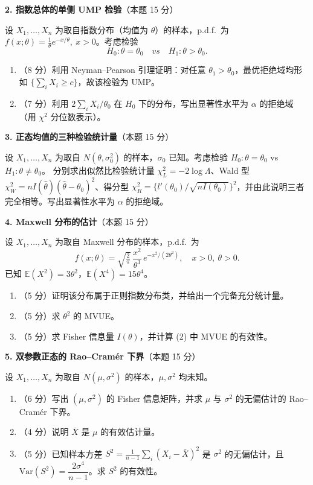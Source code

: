 \documentclass[12pt,a4paper]{ctexart}
\newcommand{\question}[2]{\bigskip\noindent\textbf{#1}\quad（本题 #2 分）\par\nobreak\medskip}
\newcommand{\E}{\mathbb{E}}
\newcommand{\Var}{\mathrm{Var}}
\begin{document}
\question{2. 指数总体的单侧 UMP 检验}{15}
设 $X_1,\dots,X_n$ 为取自指数分布（均值为 $\theta$）的样本，p.d.f.\ 为 $f(x;\theta)=\frac1\theta e^{-x/\theta},\ x>0$。考虑检验
\[ H_0:\theta=\theta_0 \quad vs \quad H_1:\theta>\theta_0. \]
\begin{enumerate}[label=(\arabic*),leftmargin=2.2em]
  \item （8 分）利用 Neyman--Pearson 引理证明：对任意 $\theta_1>\theta_0$，最优拒绝域均形如 $\{\sum_i X_i\ge c\}$，故该检验为 UMP。
  \item （7 分）利用 $2\sum_i X_i/\theta_0$ 在 $H_0$ 下的分布，写出显著性水平为 $\alpha$ 的拒绝域（用 $\chi^2$ 分位数表示）。
\end{enumerate}

\question{3. 正态均值的三种检验统计量}{15}
设 $X_1,\dots,X_n$ 为取自 $N(\theta,\sigma_0^2)$ 的样本，$\sigma_0$ 已知。考虑检验 $H_0:\theta=\theta_0$ vs $H_1:\theta\neq\theta_0$。
分别求出似然比检验统计量 $\chi_L^2=-2\log\Lambda$、Wald 型 $\chi_W^2=nI(\hat\theta)(\hat\theta-\theta_0)^2$、得分型 $\chi_R^2=\{l'(\theta_0)/\sqrt{nI(\theta_0)}\}^2$，并由此说明三者完全相等。写出显著性水平为 $\alpha$ 的拒绝域。

\question{4. Maxwell 分布的估计}{15}
设 $X_1,\dots,X_n$ 为取自 Maxwell 分布的样本，p.d.f.\ 为
\[ f(x;\theta)=\sqrt{\tfrac{2}{\pi}}\,\frac{x^2}{\theta^3}\,e^{-x^2/(2\theta^2)},\quad x>0,\ \theta>0. \]
已知 $\E(X^2)=3\theta^2$，$\E(X^4)=15\theta^4$。
\begin{enumerate}[label=(\arabic*),leftmargin=2.2em]
  \item （5 分）证明该分布属于正则指数分布类，并给出一个完备充分统计量。
  \item （5 分）求 $\theta^2$ 的 MVUE。
  \item （5 分）求 Fisher 信息量 $I(\theta)$，并计算 (2) 中 MVUE 的有效性。
\end{enumerate}

\question{5. 双参数正态的 Rao--Cramér 下界}{15}
设 $X_1,\dots,X_n$ 为取自 $N(\mu,\sigma^2)$ 的样本，$\mu,\sigma^2$ 均未知。
\begin{enumerate}[label=(\arabic*),leftmargin=2.2em]
  \item （6 分）写出 $(\mu,\sigma^2)$ 的 Fisher 信息矩阵，并求 $\mu$ 与 $\sigma^2$ 的无偏估计的 Rao--Cramér 下界。
  \item （4 分）说明 $\bar X$ 是 $\mu$ 的有效估计量。
  \item （5 分）已知样本方差 $S^2=\frac{1}{n-1}\sum_i(X_i-\bar X)^2$ 是 $\sigma^2$ 的无偏估计，且 $\Var(S^2)=\dfrac{2\sigma^4}{n-1}$。求 $S^2$ 的有效性。
\end{enumerate}
\end{document}
